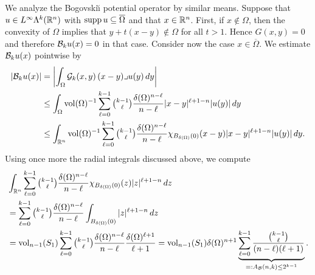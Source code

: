 \documentclass[10pt,a4paper]{article}
\begin{document}
We analyze the Bogovski\u{\i} potential operator by similar means. 
Suppose that $u \in L^{\infty}\Lambda^{k}({\mathbb R}^{n})$ with $\operatorname{supp} u \subseteq \overline\Omega$ and that $x \in {\mathbb R}^{n}$.
First, if $x \notin \Omega$, then the convexity of $\Omega$ implies that $y + t( x - y ) \notin \Omega$ for all $t > 1$. Hence $G(x,y) = 0$ and therefore ${\mathcal B}_{k} u(x) = 0$ in that case.
Consider now the case $x \in \overline\Omega$. 
We estimate ${\mathcal B}_{k} u(x)$ pointwise by 
\begin{align*}
    \left| {\mathcal B}_{k} u(x) \right|
    &=
    \left| 
        \int_{\Omega} {\mathcal G}_{k}(x,y) \,(x-y)\lrcorner u(y)\,dy
    \right| 
    \\&\leq 
    \int_{\Omega} \operatorname{vol}(\Omega)^{-1} \sum_{\ell=0}^{k-1}\tbinom{k-1}{\ell} \frac{ {\delta}(\Omega)^{n-\ell} }{n-\ell} |x-y|^{\ell+1-n} |u(y)| \,dy
    \\&\leq 
    \int_{{\mathbb R}^{n}} \operatorname{vol}(\Omega)^{-1} \sum_{\ell=0}^{k-1}\tbinom{k-1}{\ell} \frac{ {\delta}(\Omega)^{n-\ell} }{n-\ell} \chi_{B_{{\delta}(\Omega)}(0)}(x-y) |x-y|^{\ell+1-n} |u(y)| \,dy
    .
\end{align*}
Using once more the radial integrals discussed above, we compute 
\begin{align*}
    &
    \int_{{\mathbb R}^{n}} \sum_{\ell=0}^{k-1} \tbinom{k-1}{\ell} \frac{ {\delta}(\Omega)^{n-\ell} }{n-\ell} \chi_{B_{{\delta}(\Omega)}(0)}(z) |z|^{\ell+1-n} \,dz
    \\&
    =
    \sum_{\ell=0}^{k-1} \tbinom{k-1}{\ell} \frac{ {\delta}(\Omega)^{n-\ell} }{n-\ell} \int_{B_{{\delta}(\Omega)}(0)} |z|^{\ell+1-n} \,dz
    \\&
    =
    \operatorname{vol}_{n-1}(S_1) \sum_{\ell=0}^{k-1} \tbinom{k-1}{\ell} \frac{ {\delta}(\Omega)^{n-\ell} }{n-\ell} \frac{{\delta}(\Omega)^{\ell+1}}{\ell+1}
    =
    \operatorname{vol}_{n-1}(S_1) {\delta}(\Omega)^{n+1} \underbrace{ \sum_{\ell=0}^{k-1} \frac{ \tbinom{k-1}{\ell} }{ (n-\ell)(\ell+1) } }_{ =: A_{{\mathcal B}}(n,k) \leq 2^{k-1}}
    \label{equation:A_Bogov}
    .
\end{align*}
\end{document}
